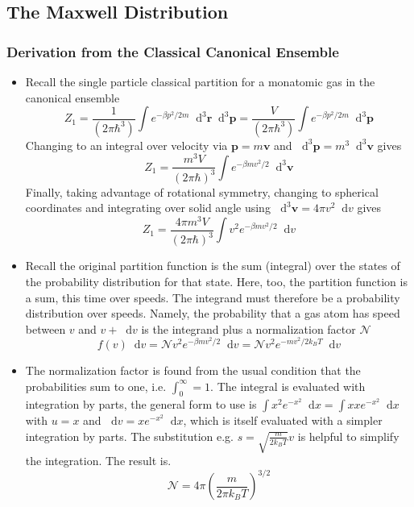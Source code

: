 \documentclass[11pt, a4paper]{article}
\newcommand{\diff}{\mathop{}\!\mathrm{d}} %
\begin{document}
\subsection{The Maxwell Distribution}

\subsubsection{Derivation from the Classical Canonical Ensemble}
\begin{itemize}
	\item Recall the single particle classical partition for a monatomic gas in the canonical ensemble
	\begin{equation*}
		Z_{1} = \frac{1}{(2\pi \hbar^{3})}\int e^{-\beta p^{2}/2m}\diff^{3}\bm{r} \diff^{3} \bm{p} = \frac{V}{(2\pi \hbar^{3})}\int e^{-\beta p^{2}/2m}\diff^{3} \bm{p} 
	\end{equation*} 
	Changing to an integral over velocity via $ \bm{p} = m \bm{v} $ and $\diff^{3}\bm{p} = m^{3} \diff^{3}\bm{v} $ gives
	\begin{equation*}
		Z_{1} = \frac{m^{3}V}{(2\pi\hbar)^{3}}\int e^{-\beta m v^{2}/2} \diff^{3}\bm{v}
	\end{equation*}
	Finally, taking advantage of rotational symmetry, changing to spherical coordinates and integrating over solid angle using $ \diff^{3}\bm{v} = 4\pi v^{2}\diff v $ gives
	\begin{equation*}
		Z_{1} = \frac{4\pi m^{3}V}{(2\pi\hbar)^{3}}\int v^{2} e^{-\beta m v^{2}/2} \diff v
	\end{equation*}
	
	\item Recall the original partition function is the sum (integral) over the states of the probability distribution for that state. Here, too, the partition function is a sum, this time over speeds. The integrand must therefore be a probability distribution over speeds. Namely, the probability that a gas atom has speed between $ v $ and $ v + \diff v $ is the integrand plus a normalization factor $ \mathcal{N} $
	\begin{equation*}
		f(v) \diff v = \mathcal{N} v^{2} e^{-\beta mv^{2}/2} \diff v = \mathcal{N} v^{2} e^{-mv^{2}/2k_{B}T} \diff v
	\end{equation*}
	
	\item The normalization factor is found from the usual condition that the probabilities sum to one, i.e. $ \int_{0}^{\infty} = 1$. The integral is evaluated with integration by parts, the general form to use is $ \int x^{2} e^{-x^{2}} \diff x = \int x x e^{-x^{2}} \diff x$ with $ u = x $ and $ \diff v =  x e^{-x^{2}} \diff x$, which is itself evaluated with a simpler integration by parts. The substitution e.g. $ s = \sqrt{\frac{m}{2k_{B}T}} v $ is helpful to simplify the integration. The result is.
	\begin{equation*}
		\mathcal{N} = 4\pi \left(\frac{m}{2\pi k_{B}T} \right)^{3/2}
	\end{equation*}
	

\end{itemize}
\end{document}
